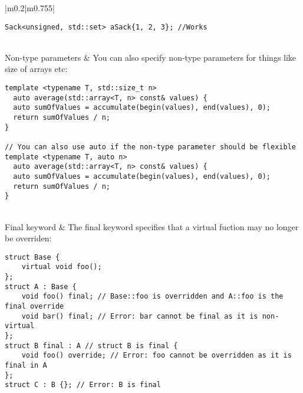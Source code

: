 \documentclass[main.tex,fontsize=8pt,paper=a4,paper=portrait,DIV=calc]{scrartcl}
\begin{document}
\begin{table}[ht!]
\begin{tabular}{|m{0.2\linewidth}|m{0.755\linewidth}|}
\begin{lstlisting}
Sack<unsigned, std::set> aSack{1, 2, 3}; //Works
\end{lstlisting}\\
\hline
Non-type parameters & 
You can also specify non-type parameters for things like size of arrays etc:\newline
\begin{lstlisting}
template <typename T, std::size_t n>
  auto average(std::array<T, n> const& values) {
  auto sumOfValues = accumulate(begin(values), end(values), 0);
  return sumOfValues / n;
}

// You can also use auto if the non-type parameter should be flexible
template <typename T, auto n>
  auto average(std::array<T, n> const& values) {
  auto sumOfValues = accumulate(begin(values), end(values), 0);
  return sumOfValues / n;
}
\end{lstlisting}\\
\hline
Final keyword & 
The final keyword specifies that a virtual fuction may no longer be overriden:\newline
\begin{lstlisting}
struct Base {
    virtual void foo();
};
struct A : Base {
    void foo() final; // Base::foo is overridden and A::foo is the final override
    void bar() final; // Error: bar cannot be final as it is non-virtual
};
struct B final : A // struct B is final {
    void foo() override; // Error: foo cannot be overridden as it is final in A
};
struct C : B {}; // Error: B is final
\end{lstlisting}
\\
\hline
\end{tabular}
\end{table}
\pagebreak
\begin{table}[ht!]
\begin{tabular}{|m{0.2\linewidth}|m{0.755\linewidth}|}
\hline
\end{tabular}
\end{table}
\pagebreak
\end{document}
